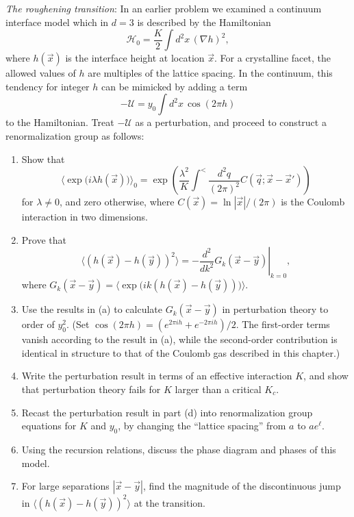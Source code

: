\begin{problem}
    \textit{The roughening transition}: In an earlier problem we examined a continuum interface model which in $d = 3$ is described by the Hamiltonian
    \[
        \mathcal{H}_0 = \frac{K}{2}\int d^2x\,(\nabla h)^2,
    \]
    where $h(\vec{x})$ is the interface height at location $\vec{x}$. For a crystalline facet, the allowed values of $h$ are multiples of the lattice spacing. In the continuum, this tendency for integer $h$ can be mimicked by adding a term
    \[
        -\mathcal{U} = y_0\int d^2x\,\cos(2\pi h)
    \]
    to the Hamiltonian. Treat $-\mathcal{U}$ as a perturbation, and proceed to construct a renormalization group as follows:

    \begin{enumerate}
        \item[(a)] Show that
        \[
            \bigl\langle\exp\!\bigl(i\lambda h(\vec{x})\bigr)\bigr\rangle_0 = \exp\!\left(\frac{\lambda^2}{K}\int^<\frac{d^2q}{(2\pi)^2}C(\vec{q};\vec{x}-\vec{x}')\right)
        \]
        for $\lambda\neq 0$, and zero otherwise, where $C(\vec{x}) = \ln|\vec{x}|/(2\pi)$ is the Coulomb interaction in two dimensions.

        \item[(b)] Prove that
        \[
            \bigl\langle(h(\vec{x})-h(\vec{y}))^2\bigr\rangle = -\left.\frac{d^2}{dk^2}G_k(\vec{x}-\vec{y})\right|_{k=0},
        \]
        where $G_k(\vec{x}-\vec{y}) = \bigl\langle\exp\!\bigl(ik(h(\vec{x})-h(\vec{y}))\bigr)\bigr\rangle$.

        \item[(c)] Use the results in (a) to calculate $G_k(\vec{x}-\vec{y})$ in perturbation theory to order of $y_0^2$. (Set $\cos(2\pi h) = (e^{2\pi ih} + e^{-2\pi ih})/2$. The first-order terms vanish according to the result in (a), while the second-order contribution is identical in structure to that of the Coulomb gas described in this chapter.)

        \item[(d)] Write the perturbation result in terms of an effective interaction $K$, and show that perturbation theory fails for $K$ larger than a critical $K_c$.

        \item[(e)] Recast the perturbation result in part (d) into renormalization group equations for $K$ and $y_0$, by changing the ``lattice spacing'' from $a$ to $ae^\ell$.

        \item[(f)] Using the recursion relations, discuss the phase diagram and phases of this model.

        \item[(g)] For large separations $|\vec{x} - \vec{y}|$, find the magnitude of the discontinuous jump in $\langle(h(\vec{x})-h(\vec{y}))^2\rangle$ at the transition.
    \end{enumerate}
\end{problem}


